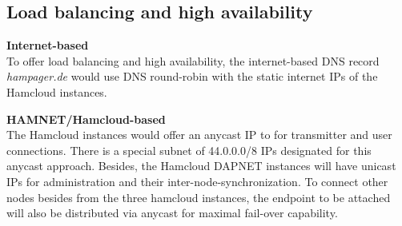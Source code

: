 
\subsection{Load balancing and high availability}
\textbf{Internet-based}\\
To offer load balancing and high availability, the internet-based DNS record \textit{hampager.de} would use DNS round-robin with the static internet IPs of the Hamcloud instances.

\textbf{HAMNET/Hamcloud-based}\\
The Hamcloud instances would offer an anycast IP to for transmitter and user connections. There is a special subnet of 44.0.0.0/8 IPs designated for this anycast approach. Besides, the Hamcloud DAPNET instances will have unicast IPs for administration and their inter-node-synchronization.
To connect other nodes besides from the three hamcloud instances, the endpoint to be attached will also be distributed via anycast for maximal fail-over capability.




